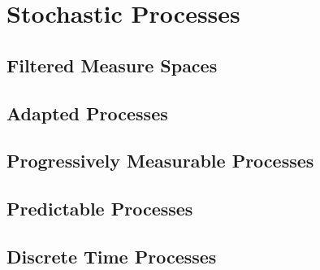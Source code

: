 ﻿%

\chapter{Stochastic Processes}\label{chapter:stochastic_processes}

\section{Filtered Measure Spaces}
\section{Adapted Processes}
\section{Progressively Measurable Processes}
\section{Predictable Processes}

\section{Discrete Time Processes}
